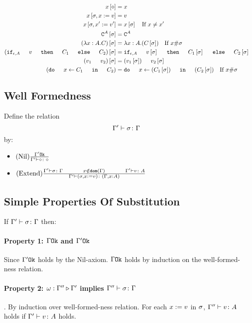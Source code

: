 {        
        \begin{align}
            x\sub{\nil} & = x \\
            x\sub{\si,x\setto v} & = v \\
            x\sub{\si,x'\setto v'} & = x\ssi\qt{If }x \neq x'\\
            \const{A}\ssi & = \const{A} \\
            (\lam{x}{A}{C})\ssi &= \lam{x}{A}{(C\ssi)}\qt{If }x\#\si\\
            (\ifthenelse{\e}{A}{v}{C_1}{C_2})\ssi &= \ifthenelse{\e}{A}{v\ssi}{C_1\ssi}{C_2\ssi}\\
            (\apply{v_1}{v_2})\ssi&= \apply{(v_1\ssi)}{v_2\ssi}\\
            (\doin{x}{C_1}{C_2})&= \doin{x}{(C_1\ssi)}{(C_2\ssi)}\qt{If } x\#\si\\
        \end{align}
    \subsection{Well Formedness}
    Define the relation $$\Gamma' \vdash \sigma \colon \Gamma$$ by:

    \begin{itemize}
        \item $(\text{Nil}) \frac{\Gamma' \texttt{Ok}}{\Gamma' \vdash \diamond \colon \diamond}$
        \item $\treerule{Extend}{
            \typerelation{\G'}{\si}{\G}
            \s\s
            x\notin\dom{\G}
            \s\s
            \typerelation{\G'}{v}{A}
        }{
            \typerelation{\G'}{(\si, x \setto v)}{(\gax)}
        }$
    \end{itemize}
    \subsection{Simple Properties Of Substitution}
    If $\Gamma' \vdash \sigma \colon \Gamma$ then:

        \paragraph{Property 1: $\Gamma \texttt{Ok}$ and $\Gamma' \texttt{Ok}$}
         Since $\Gamma' \texttt{Ok}$ holds by the Nil-axiom. $\Gamma \texttt{Ok}$ holds by induction on the well-formed-ness relation.
        \paragraph{Property 2: $\omega : \Gamma'' \triangleright \Gamma'$ implies $\Gamma'' \vdash \sigma \colon \Gamma$}. 
        By induction over well-formed-ness relation. For each $x:= v$ in $\sigma$, $\Gamma'' \vdash v \colon A$ holds if $\Gamma' \vdash v \colon A$ holds.
}
